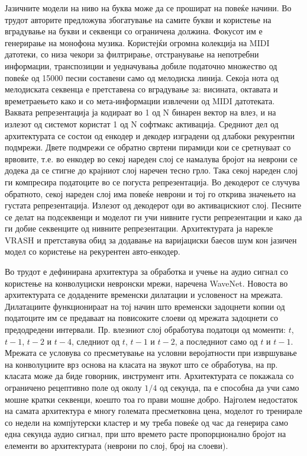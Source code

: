 Јазичните модели на ниво на буква може да се прошират на повеќе начини. Во трудот \cite{Tikhonov2017} авторите предложува збогатување на самите букви и користење на  вградување на букви и секвенци со ограничена должина. Фокусот им е генерирање на монофона музика. Користејќи огромна колекција на MIDI датотеки, со низа чекори за филтрирање, отстранување на непотребни информации, транспозиции и уедначувања добиле податочно множество од повеќе од 15000 песни составени само од мелодиска линија. Секоја нота од мелодиската секвенца е претставена со вградување за: висината, октавата и времетраењето како и со мета-информации извлечени од MIDI датотеката. Ваквата репрезентација ја кодираат во 1 од N бинарен вектор на влез, и на излезот од системот користат 1 од N софтмакс активација. Средниот дел од архитектурата се состои од енкодер и декодер изградени од длабоки рекурентни подмрежи. Двете подмрежи се обратно свртени пирамиди кои се сретнуваат со врвовите, т.е. во енкодер во секој нареден слој се намалува бројот на неврони се додека да се стигне до крајниот слој наречен тесно грло. Така секој нареден слој ги компресира податоците во се погуста репрезентација. Во декодерот се случува обратното, секој нареден слој има повеќе неврони и тој го открива значењето на густата репрезентација. Излезот од декодерот оди во активацискиот слој. Песните се делат на подсеквенци и моделот ги учи нивните густи репрезентации и како да ги добие секвенците од нивните репрезентации. Архитектурата ја нарекле VRASH и претставува обид за додавање на варијациски баесов шум кон јазичен модел со користење на рекурентен авто-енкодер.

Во трудот \cite{Oord2016} е дефинирана архитектура за обработка и учење на аудио сигнал со користење на конволуциски невронски мрежи, наречена WaveNet. Новоста во архитектурата се додадените временски дилатации и условеност на мрежата. Дилатациите функционираат на тој начин што временски задоцнети копии од податоците им се предаваат на повисоките слоеви од мрежата задоцнети со предодредени интервали. Пр. влезниот слој обработува податоци од моменти: $t$, $t-1$, $t-2$ и $t-4$, следниот од $t$, $t-1$ и $t-2$, а последниот само од $t$ и $t-1$. Мрежата се условува со пресметување на условни веројатности при извршување на конволуциите врз основа на класата на звукот што се обработува, на пр. класата може да биде говорник, инструмент итн. Архитектурата се покажала со ограничено рецептивно поле од околу $1/4$ од секунда, па е способна да учи само мошне кратки секвенци, коешто тоа го прави мошне добро. Најголем недостаток на самата архитектура е многу големата пресметковна цена, моделот го тренирале со недели на компјутерски кластер и му треба повеќе од час да генерира само една секунда аудио сигнал, при што времето расте пропорционално бројот на елементи во архитектурата (неврони по слој, број на слоеви).


